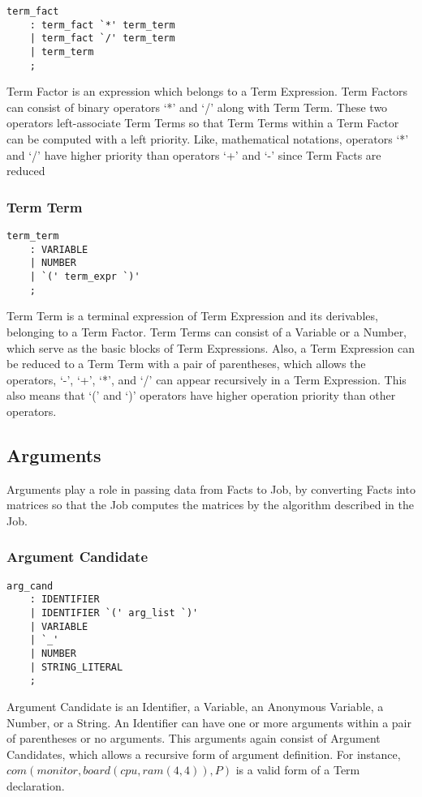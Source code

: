 \documentclass[prodmode,acmtecs]{acmsmall}
\begin{document}
\begin{lstlisting}
term_fact
	: term_fact `*' term_term
	| term_fact `/' term_term
	| term_term
	;
\end{lstlisting}

Term Factor is an expression which belongs to a Term Expression.  Term 
Factors can consist of binary operators `*' and `/' along with Term
Term.  These two operators left-associate Term Terms so that Term
Terms within a Term Factor can be computed with a left priority. Like,
mathematical notations, operators `*' and `/' have higher priority than
operators `+' and `-' since Term Facts are reduced 
\medskip


\subsubsection{Term Term}
\begin{lstlisting}
term_term
	: VARIABLE
	| NUMBER
	| `(' term_expr `)'
	;
\end{lstlisting}

Term Term is a terminal expression of Term Expression and its derivables,
belonging to a Term Factor.  Term Terms can consist of a Variable or a
Number, which serve as the basic blocks of Term Expressions.  Also, a Term
Expression can be reduced to a Term Term with a pair of parentheses, which
allows the operators, `-', `+', `*', and `/' can appear recursively in a
Term Expression.  This also means that `(' and `)' operators have higher
operation priority than other operators.
\medskip

\subsection{Arguments}
Arguments play a role in passing data from Facts to Job, by converting Facts
into matrices so that the Job computes the matrices by the algorithm
described in the Job.

\subsubsection{Argument Candidate}
\begin{lstlisting}
arg_cand
	: IDENTIFIER
	| IDENTIFIER `(' arg_list `)'
	| VARIABLE
	| `_'
	| NUMBER
	| STRING_LITERAL
	;
\end{lstlisting}

Argument Candidate is an Identifier, a Variable, an Anonymous
Variable, a Number, or a String.  An Identifier can have one
or more arguments within a pair of parentheses or no arguments.
This arguments again consist of Argument Candidates, which
allows a recursive form of argument definition.  For instance, 
$com(monitor, board(cpu, ram(4, 4)), P)$ is a valid form
of a Term declaration.
\medskip
\end{document}
